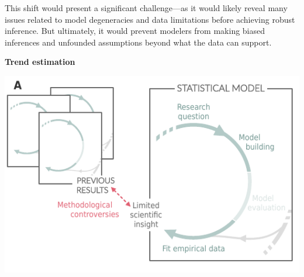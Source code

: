 \documentclass[11pt]{article}
\begin{document}
This shift would present a significant challenge---as it would likely reveal many issues related to model degeneracies and data limitations before achieving robust inference. But ultimately, it would prevent modelers from making biased inferences and unfounded assumptions beyond what the data can support. 


\begin{tcolorbox}[
sharp corners=all,
colback=white,
colframe=black,
size=tight,
boxrule=0.1mm,
grow to left by=+1cm, grow to right by=+1cm,
enlarge top by=-1.2cm,
left=3mm,right=3mm, top = 2mm, bottom = 2mm,
fontupper=\footnotesize
]
{\begin{multicols}{2}

\centerline{\bf Trend estimation}
\vspace*{2mm}
\begin{minipage}[t]{\linewidth}
    \includegraphics[width=\linewidth]{figures/trendestimation_details}

    \vspace*{1mm}
\end{minipage}


\end{multicols}}
\end{tcolorbox}
\end{document}

